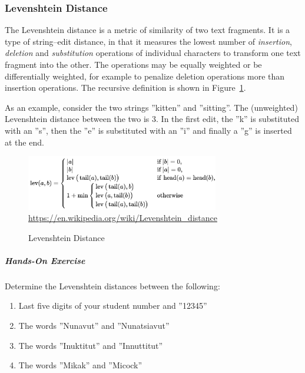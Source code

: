 \subsubsection*{Levenshtein Distance}

The Levenshtein distance is a metric of similarity of two text fragments. It is a type of string--edit distance, in that it measures the lowest number of \emph{insertion}, \emph{deletion} and \emph{substitution} operations of individual characters to transform one text fragment into the other. The operations may be equally weighted or be differentially weighted, for example to penalize deletion operations more than insertion operations. The recursive definition is shown in Figure~\ref{fig:levenshtein}. 

As an example, consider the two strings ''kitten'' and ''sitting''. The (unweighted) Levenshtein distance between the two is 3. In the first edit, the ''k'' is substituted with an ''s'', then the ''e'' is substituted with an ''i'' and finally a ''g'' is inserted at the end.

\begin{figure}
\centering
\includegraphics[width=0.75\textwidth]{screen6.png} \\

\scriptsize
\url{https://en.wikipedia.org/wiki/Levenshtein_distance}
\caption{Levenshtein Distance}
\label{fig:levenshtein}
\end{figure}


\begin{tcolorbox}[colback=code]
\subparagraph*{Hands-On Exercise} 
Determine the Levenshtein distances between the following:
\begin{enumerate}
  \item Last five digits of your student number and ''12345''
  \item The words ''Nunavut'' and ''Nunatsiavut''
  \item The words ''Inuktitut'' and ''Innuttitut''
  \item The words ''Mikak'' and ''Micock''
\end{enumerate}
\end{tcolorbox}


